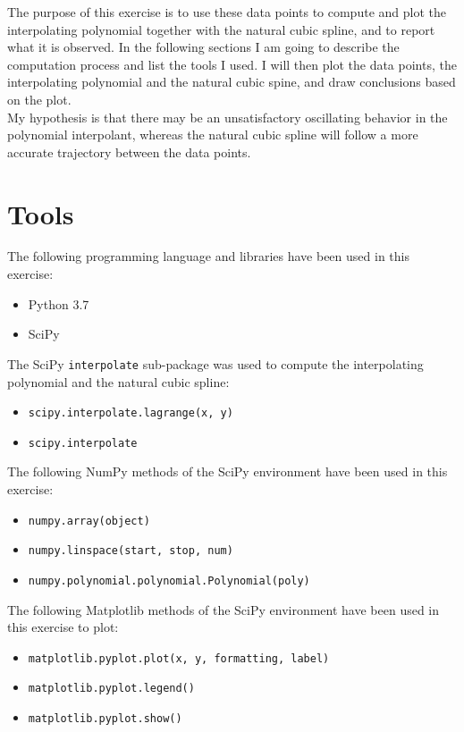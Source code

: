 \documentclass{article}
\newcommand{\code}{\texttt}
\begin{document}
The purpose of this exercise is to use these data points to compute and plot the interpolating polynomial together with the natural cubic spline, and to report what it is observed. In the following sections I am going to describe the computation process and list the tools I used. I will then plot the data points, the interpolating polynomial and the natural cubic spine, and draw conclusions based on the plot. \\

My hypothesis is that there may be an unsatisfactory oscillating behavior in the polynomial interpolant, whereas the natural cubic spline will follow a more accurate trajectory between the data points. 

\section{Tools}
The following programming language and libraries have been used in this exercise:
\begin{itemize}
  \item Python 3.7
  \item SciPy
\end{itemize}
The SciPy \code{interpolate} sub-package was used to compute the interpolating polynomial and the natural cubic spline:
\begin{itemize}
  \item \code{scipy.interpolate.lagrange(x, y)}
  \item \code{scipy.interpolate}
\end{itemize}

The following NumPy methods of the SciPy environment have been used in this exercise:
\begin{itemize}
  \item \code{numpy.array(object)}
  \item \code{numpy.linspace(start, stop, num)}
  \item \code{numpy.polynomial.polynomial.Polynomial(poly)}
  \end{itemize}
The following Matplotlib methods of the SciPy environment have been used in this exercise to plot:
 \begin{itemize}
  \item \code{matplotlib.pyplot.plot(x, y, formatting, label)}
  \item \code{matplotlib.pyplot.legend()}
  \item \code{matplotlib.pyplot.show()}
  \end{itemize}
  
\end{document}
